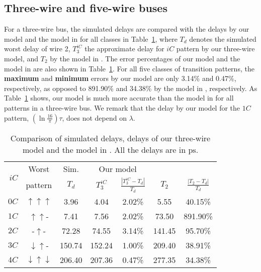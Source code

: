 \documentclass[10pt,journal]{IEEEtran}
\begin{document}
\subsection{Three-wire and five-wire buses}
For a three-wire bus, the simulated delays are compared with the delays by our model and the model in \cite{Sot01} for all classes in Table~\ref{tab:1}, where $T_d$ denotes the simulated worst delay of wire 2, $T^{iC}_3$ the approximate delay for $iC$ pattern by our three-wire model, and $T_2$ by the model in \cite{Sot01}. The error percentages of our model and the model in \cite{Sot01} are also shown in Table~\ref{tab:1}. For all five classes of transition patterns, the \textbf{maximum} and \textbf{minimum} errors by our model are only 3.14\% and 0.47\%, respectively, as opposed to 891.90\% and 34.38\% by the model in \cite{Sot01}, respectively. As Table~\ref{tab:1} shows, our model is much more accurate than the model in \cite{Sot01} for all patterns in a three-wire bus. We remark that the delay by our model for the $1C$ pattern, $\left(\ln{\frac{16}{\pi}}\right)\tau$, does not depend on $\lambda$.


\begin{table}
\caption{Comparison of simulated delays, delays of our three-wire model and the model in \cite{Sot01}. All the delays are in $\mathrm{ps}$.}\label{tab:1}
\begin{center}
\begin{tabular}{|r|c|c|c|c|c|c|}
\hline
\multirow{2}{*}{$iC$}& Worst & Sim. & \multicolumn{2}{|c|}{Our model} & \multicolumn{2}{|c|}{\cite{Sot01}}\\
\cline{3-7} & pattern & $T_d$ & $T^{iC}_3$ & $\frac{|T^{iC}_3-T_d|}{T_d}$ & $T_2$ &  $\frac{|T_2-T_d|}{T_d}$\\
\hline
$0C$ & $\uparrow \uparrow \uparrow$ & 3.96 & 4.04 & 2.02\% & 5.55 & 40.15\%\\
\hline
$1C$ & $\uparrow \uparrow$- & 7.41 & 7.56 & 2.02\% & 73.50  & 891.90\%\\
\hline
$2C$ & -$\uparrow$- & 72.28 & 74.55 &  3.14\% & 141.45 & 95.70\%\\
\hline
$3C$ & $\downarrow \uparrow$- & 150.74 & 152.24 &  1.00\% & 209.40 & 38.91\%\\
\hline
$4C$ & $\downarrow \uparrow \downarrow$ & 206.40 & 207.36 & 0.47\% & 277.35  & 34.38\%\\
\hline
\end{tabular}
\end{center}
\end{table}
\end{document}
